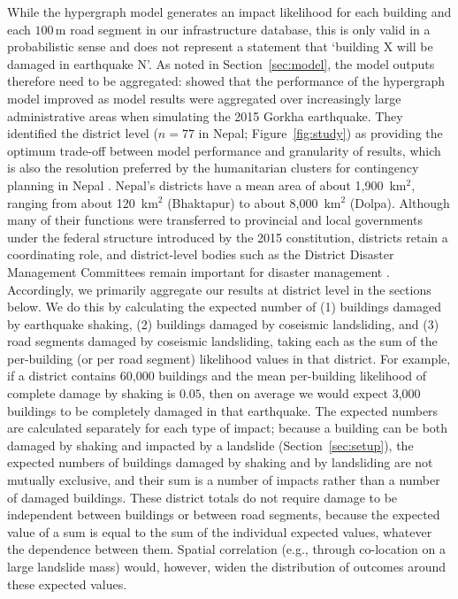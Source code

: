 \documentclass[preprint,12pt,authoryear]{elsarticle}
\begin{document}
While the hypergraph model generates an impact likelihood for each building and each $100\,\text{m}$ road segment in our infrastructure database, this is only valid in a probabilistic sense and does not represent a statement that `building X will be damaged in earthquake N'. As noted in Section~\ref{sec:model}, the model outputs therefore need to be aggregated: \cite{Dunant2025} showed that the performance of the hypergraph model improved as model results were aggregated over increasingly large administrative areas when simulating the 2015 Gorkha earthquake. They identified the district level ($n = 77$ in Nepal; Figure~\ref{fig:study}) as providing the optimum trade-off between model performance and granularity of results, which is also the resolution preferred by the humanitarian clusters for contingency planning in Nepal \citep{Sijapati2024}. Nepal's districts have a mean area of about 1,900~km$^2$, ranging from about 120~km$^2$ (Bhaktapur) to about 8,000~km$^2$ (Dolpa). Although many of their functions were transferred to provincial and local governments under the federal structure introduced by the 2015 constitution, districts retain a coordinating role, and district-level bodies such as the District Disaster Management Committees remain important for disaster management \citep{Bhandari2020}. Accordingly, we primarily aggregate our results at district level in the sections below. We do this by calculating the expected number of (1) buildings damaged by earthquake shaking, (2) buildings damaged by coseismic landsliding, and (3) road segments damaged by coseismic landsliding, taking each as the sum of the per-building (or per road segment) likelihood values in that district. For example, if a district contains 60,000 buildings and the mean per-building likelihood of complete damage by shaking is $0.05$, then on average we would expect 3,000 buildings to be completely damaged in that earthquake. The expected numbers are calculated separately for each type of impact; because a building can be both damaged by shaking and impacted by a landslide (Section~\ref{sec:setup}), the expected numbers of buildings damaged by shaking and by landsliding are not mutually exclusive, and their sum is a number of impacts rather than a number of damaged buildings. These district totals do not require damage to be independent between buildings or between road segments, because the expected value of a sum is equal to the sum of the individual expected values, whatever the dependence between them. Spatial correlation (e.g., through co-location on a large landslide mass) would, however, widen the distribution of outcomes around these expected values.
\end{document}
